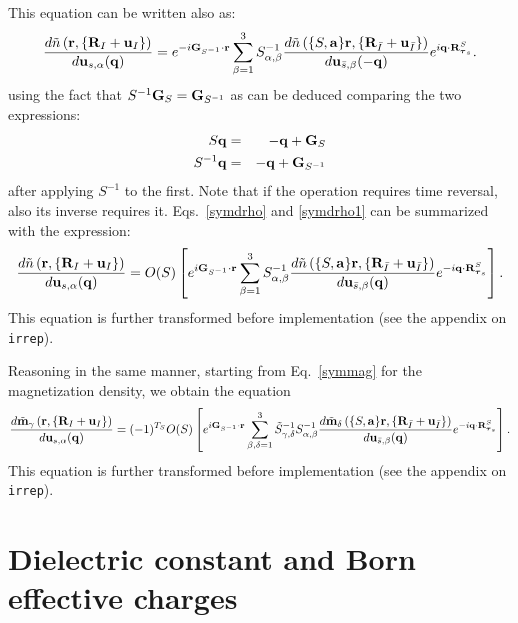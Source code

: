 \documentclass[12pt,a4paper,twoside]{report}
\begin{document}
This equation can be written also as: 
\begin{equation}
{d \tilde n\left({\bf r}, \{{\bf R}_I + {\bf u}_I\}\right)
\over d {\bf u}_{s,\alpha}({\bf q})} 
= e^{-i{\bf G}_{S^{-1}} \cdot {\bf r}}
\sum_{\beta=1}^3 S^{-1}_{\alpha,\beta} {d \tilde n\left(\{S,{\bf a}\} {\bf r}, \{{\bf R}_{\bar I} + {\bf u}_{\bar I}\}\right)
\over d {\bf u}_{\bar s,\beta} (-{\bf q})} e^{i{\bf q}\cdot {\bf R}^S_{{\boldsymbol{\tau}_s}}}.
\label{symdrho1}
\end{equation}
using the fact that $S^{-1} {\bf G}_S={\bf G}_{S^{-1}}$
as can be deduced comparing the two expressions:
\begin{eqnarray}
S{\bf q}&=&-{\bf q} + {\bf G}_S \nonumber \\
S^{-1}{\bf q}&=&-{\bf q} + {\bf G}_{S^{-1}}
\end{eqnarray}
after applying $S^{-1}$ to the first. Note that if the operation requires time reversal, also its inverse requires it.
Eqs.~\ref{symdrho} and \ref{symdrho1} can be summarized with the expression:
\begin{equation}
{d \tilde n\left({\bf r}, \{{\bf R}_I + {\bf u}_I\}\right)
\over d {\bf u}_{s,\alpha}({\bf q})} 
= O(S)\left[ e^{i{\bf G}_{S^{-1}} \cdot {\bf r}}
\sum_{\beta=1}^3 S^{-1}_{\alpha,\beta} {d \tilde n\left(\{S,{\bf a}\} {\bf r}, \{{\bf R}_{\bar I} + {\bf u}_{\bar I}\}\right)
\over d {\bf u}_{\bar s,\beta} ({\bf q})} e^{-i{\bf q}\cdot {\bf R}^S_{{\boldsymbol{\tau}_s}}}\right].
\label{symdrho_final1}
\end{equation}
This equation is further transformed before implementation (see the appendix on \texttt{irrep}).

Reasoning in the same manner, starting from
Eq.~\ref{symmag} for the magnetization density, we obtain the equation
\begin{equation}
{d \tilde {\bf m}_\gamma \left({\bf r}, \{{\bf R}_I + {\bf u}_I\}\right)
\over d {\bf u}_{s,\alpha}({\bf q})} 
= (-1)^{T_{S}} O(S)\left[ e^{i{\bf G}_{S^{-1}} \cdot {\bf r}}
\sum_{\beta,\delta=1}^3 \tilde S^{-1}_{\gamma,\delta} S^{-1}_{\alpha,\beta} {d \tilde {\bf m}_\delta\left(\{S,{\bf a}\} {\bf r}, \{{\bf R}_{\bar I} + {\bf u}_{\bar I}\}\right)
\over d {\bf u}_{\bar s,\beta} ({\bf q})} e^{-i{\bf q}\cdot {\bf R}^S_{{\boldsymbol{\tau}_s}}}\right].
\label{symdmag_final1}
\end{equation}
This equation is further transformed before implementation (see the appendix on \texttt{irrep}).


\section{Dielectric constant and Born effective charges}
\end{document}

